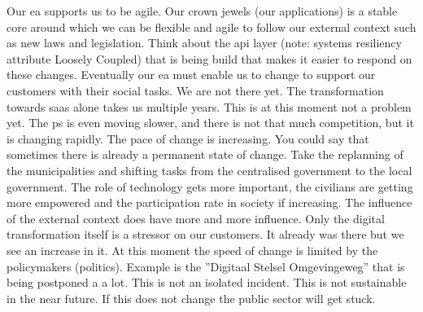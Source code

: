 Our \acrshort{ea} supports us to be agile. Our crown jewels (our applications) is a stable core around which we can be flexible and agile to follow our external context such as new laws and legislation. Think about the \acrfull{api} layer (note: systems \gls{resiliency} attribute Loosely Coupled) that is being build that makes it easier to respond on these changes. Eventually our \acrshort{ea} must enable us to change to support our customers with their social tasks. We are not there yet. The transformation towards \acrfull{saas} alone takes us multiple years. This is at this moment not a problem yet. The \gls{ps} is even moving slower, and there is not that much competition, but it is changing rapidly. The pace of change is increasing. You could say that sometimes there is already a permanent state of change. Take the replanning of the municipalities and shifting tasks from the centralised government to the local government. The role of technology gets more important, the civilians are getting more empowered and the participation rate in society if increasing. The influence of the external context does have more and more influence. Only the digital transformation itself is a stressor on our customers. It already was there but we see an increase in it. At this moment the speed of change is limited by the policymakers (politics). Example is the ''Digitaal Stelsel Omgevingeweg'' that is being postponed a a lot. This is not an isolated incident. This is not sustainable in the near future. If this does not change the public sector will get stuck.
